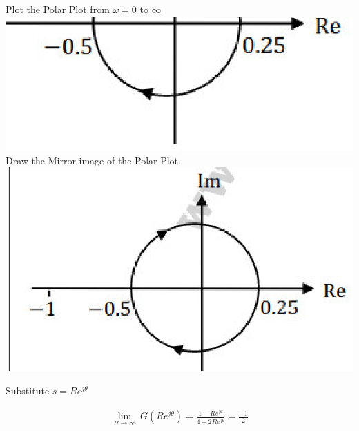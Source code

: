 \begin{enumerate}[label=\thesection.\arabic*.,ref=\thesection.\theenumi]
Plot the Polar Plot from $\omega=0$ to $\infty$ \\
\includegraphics[width=\columnwidth]{./figs/image2.eps}\\
Draw the Mirror image of the Polar Plot.\\
\includegraphics[width=\columnwidth]{./figs/image1.eps}\\

\begin{center}
Substitute $s = Re^{j\theta}$
\end{center}

\begin{align}
\lim_{R\to \infty}\,G(Re^{j\theta})=\frac{1-Re^{j\theta}}{4+2Re^{j\theta}}=\frac{-1}{2}  
\end{align}


\end{enumerate}
